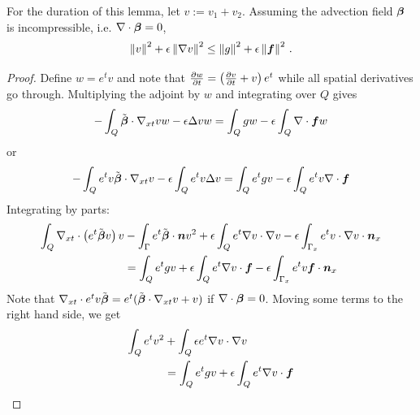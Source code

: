 \documentclass[Dissertation.tex]{subfiles}
\begin{document}
\begin{lemma}
\label{lem:l2}
For the duration of this lemma, let $v:=v_1+v_2$.
Assuming the advection field $\boldsymbol\beta$ is incompressible, i.e. $\nabla\cdot\boldsymbol\beta=0$,
\[
\left\| v \right\|^2+\epsilon\left\| \nabla v \right\|^2\leq\left\| g \right\|^2+\epsilon\left\| \boldsymbol f \right\|^2\,.
\]
\end{lemma}
\begin{proof}
Define $w=e^{t}v$ and note that $\frac{\partial w}{\partial t}=\left( \frac{\partial v}{\partial t}+v \right)e^{t}$ while
all spatial derivatives go through.
Multiplying the adjoint by $w$ and integrating over $Q$ gives
\begin{align*}
-\int_Q\tilde{\boldsymbol\beta}\cdot\nabla_{xt} vw-\epsilon\Delta vw=\int_Qgw-\epsilon\int_Q\nabla\cdot\boldsymbol f w
\end{align*}
or
\begin{align*}
-\int_Qe^{t}v\tilde{\boldsymbol\beta}\cdot\nabla_{xt} v-\epsilon\int_Q e^{t}v\Delta v=\int_Qe^{t}gv-\epsilon\int_Qe^{t}v\nabla\cdot\boldsymbol f
\end{align*}
Integrating by parts:
\begin{align*}
\int_Q\nabla_{xt}\cdot\left( e^{t}\tilde{\boldsymbol\beta} v \right)v&
-\int_\Gamma e^{t}\tilde{\boldsymbol\beta}\cdot\boldsymbol n v^2
+\epsilon\int_Qe^{t}\nabla v\cdot\nabla v
-\epsilon\int_{\Gamma_x}e^{t}v\cdot\nabla v\cdot\boldsymbol n_x
\\
&=
\int_Qe^{t}gv
+\epsilon\int_Qe^{t}\nabla v\cdot\boldsymbol f
-\epsilon\int_{\Gamma_x}e^{t}v\boldsymbol f\cdot\boldsymbol n_x
\end{align*}
Note that $\nabla_{xt}\cdot{e^{t}v\tilde{\boldsymbol\beta}}=e^{t}(\tilde{\boldsymbol\beta}\cdot\nabla_{xt} v+v)$ if $\nabla\cdot\boldsymbol\beta=0$.
Moving some terms to the right hand side, we get
\begin{align*}
\int_Q e^{t}v^2
&+\int_Q\epsilon e^{t}\Grad v\cdot\Grad v
\\
&=
\int_Qe^{t}gv
+\epsilon\int_Qe^{t}\Grad v\cdot\bff

\end{align*}
\end{proof}
\end{document}
